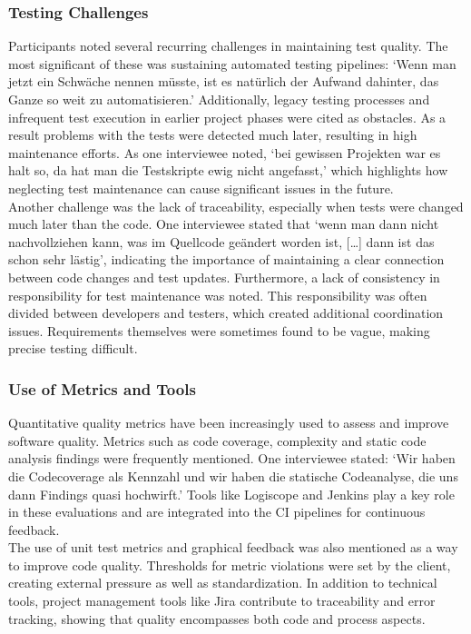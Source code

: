 \subsubsection{Testing Challenges}
Participants noted several recurring challenges in maintaining test quality. The most significant of these was sustaining automated testing pipelines: `Wenn man jetzt ein Schwäche nennen müsste, ist es natürlich der Aufwand dahinter, das Ganze so weit zu automatisieren.'
Additionally, legacy testing processes and infrequent test execution in earlier project phases were cited as obstacles. As a result problems with the tests were detected much later, resulting in high maintenance efforts. 
As one interviewee noted, `bei gewissen Projekten war es halt so, da hat man die Testskripte ewig nicht angefasst,' which highlights how neglecting test maintenance can cause significant issues in the future.\\
Another challenge was the lack of traceability, especially when tests were changed much later than the code. One interviewee stated that `wenn man dann nicht nachvollziehen kann, was im Quellcode geändert worden ist, [\ldots] dann ist das schon sehr lästig', indicating
the importance of maintaining a clear connection between code changes and test updates. Furthermore, a lack of consistency in responsibility for test maintenance was noted.
This responsibility was often divided between developers and testers, which created additional coordination issues.
Requirements themselves were sometimes found to be vague, making precise testing difficult.\\

\subsubsection{Use of Metrics and Tools}
Quantitative quality metrics have been increasingly used to assess and improve software quality. Metrics such as code coverage, complexity and static code analysis findings were frequently mentioned. One interviewee stated: `Wir haben die Codecoverage als Kennzahl und wir haben die statische Codeanalyse,
die uns dann Findings quasi hochwirft.' Tools like Logiscope and Jenkins play a key role in these evaluations and are integrated into the CI pipelines for continuous feedback.\\
The use of unit test metrics and graphical feedback was also mentioned as a way to improve code quality. Thresholds for metric violations were set by the client, creating external pressure as well as standardization. In addition to technical tools, project management tools like Jira contribute to traceability and error tracking,
showing that quality encompasses both code and process aspects.\\

